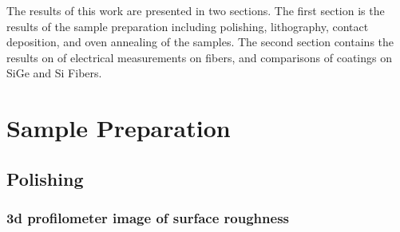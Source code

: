 
The results of this work are presented in two sections. The first section is the results of the sample preparation including polishing, lithography, contact deposition, and oven annealing of the samples. The second section contains the results on of electrical measurements on fibers, and comparisons of coatings on SiGe and Si Fibers.

\section{Sample Preparation}

\subsection{Polishing}

\subsubsection{3d profilometer image of surface roughness}


